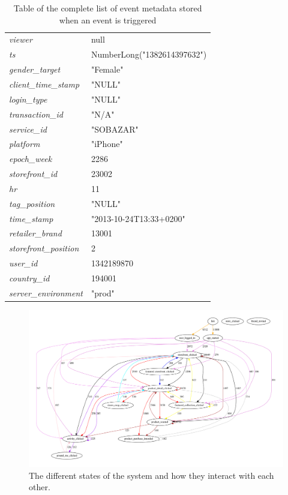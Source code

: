 \begin{table}[H]
{\begin{tabular}{l|l}
              \emph{viewer}    &   null     \\
              \emph{ts}    &   NumberLong("1382614397632")  \\
              \emph{gender\_target} &   "Female"     \\
              \emph{client\_time\_stamp} &   "NULL"   \\
              \emph{login\_type}    &   "NULL"   \\
              \emph{transaction\_id}    &   "N/A"    \\
              \emph{service\_id}    &   "SOBAZAR"    \\
              \emph{platform}  &   "iPhone"     \\
              \emph{epoch\_week}    &   2286     \\
              \emph{storefront\_id} &   23002    \\
              \emph{hr}    &   11   \\
              \emph{tag\_position}  &   "NULL"   \\
              \emph{time\_stamp}    &   "2013-10-24T13:33+0200"  \\
              \emph{retailer\_brand}    &   13001    \\
              \emph{storefront\_position}   &   2    \\
              \emph{user\_id}   &   1342189870   \\
              \emph{country\_id}    &   194001   \\
              \emph{server\_environment}    &   "prod" \\
              \bottomrule
          \end{tabular}
        }
        \caption[Complete List of Event Metadata]{Table of the complete list of event metadata stored when an event is triggered}
        \label{table:completeEventData}
    \end{table}


    \begin{figure}[H]
        \includegraphics[angle=90,width=5in]{image/statesInteractionFalse-gvfile.pdf}
        \centering
        \caption[States in session and how they interact]{The different states of the system and how they interact with each other.}
        \label{figure:statesInteractions}
    \end{figure}
